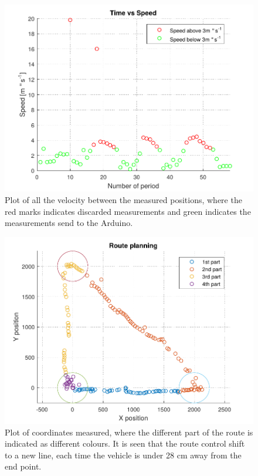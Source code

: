 \begin{figure}[H]
  \centering
	\includegraphics[scale=0.8]{figures/AccTest3.pdf}
	\caption{Plot of all the velocity between the measured positions, where the red marks indicates discarded measurements and green indicates the measurements send to the Arduino.}
	\label{AccT3fig}
\end{figure}


\begin{figure}[H]
  \centering
	\includegraphics[scale=0.8]{figures/AccTest6.pdf}
	\caption{Plot of coordinates measured, where the different part of the route is indicated as different colours. It is seen that the route control shift to a new line, each time the vehicle is under 28 cm away from the end point.}
	\label{AccT6fig}
\end{figure}


